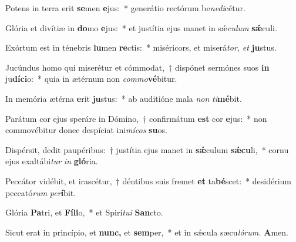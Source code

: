 \item Potens in terra erit \textbf{se}men \textbf{e}jus:~* generátio rectórum be\textit{nedi}\hspace*{-0.01em}cétur.
\item Glória et divítiæ in \textbf{do}mo \textbf{e}jus:~* et justítia ejus manet in sǽ\tinyhspace\textit{culum} \textbf{sǽ}culi.
\item Exórtum est in ténebris \textbf{lu}men \textbf{re}ctis:~* miséricors, et miserá\tinyhspace\textit{tor,} \textit{et} \textbf{ju}stus.
\item Jucúndus homo qui miserétur et cómmodat,~† dispónet sermónes suos \textbf{in} ju\textbf{díci}o:~* quia in ætérnum non \textit{commo}\textbf{vé}bitur.
\item In memória ætérna \textbf{e}rit \textbf{ju}stus:~* ab auditióne mala \textit{non} \textit{ti}\hspace*{-0.01em}\textbf{mé}bit.
\item Parátum cor ejus speráre in Dómino,~† confirmátum \textbf{est} cor \textbf{e}jus:~* non commovébitur donec despíciat ini\textit{mícos} \textbf{su}os.
\item Dispérsit, dedit paupéribus:~† justítia ejus manet in \textbf{sǽ}culum \textbf{sǽcu}li,~* cornu ejus exaltábi\textit{tur} \textit{in} \textbf{gló}ria.
\item Peccátor vidébit, et irascétur,~† déntibus suis fremet \textbf{et} ta\textbf{bé}scet:~* desidérium peccató\textit{rum} \textit{per}\textbf{í}bit.
\item Glória \textbf{Pa}tri, et \textbf{Fíli}o,~* et Spirí\tinyhspace\textit{tui} \textbf{San}cto.
\item Sicut erat in princípio, et \textbf{nunc,} et \textbf{sem}per,~* et in sǽcula sæcu\tinyhspace\textit{lórum.} \textbf{A}men.
